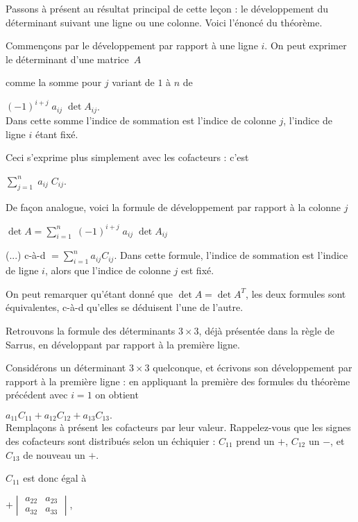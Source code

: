 Passons à présent au résultat principal de cette leçon : le développement du déterminant suivant une ligne ou une colonne. Voici l'énoncé du théorème.

\change
Commençons par le développement par rapport à une ligne $i$. On peut exprimer le déterminant d'une matrice~$A$

\change
comme la somme pour $j$ variant de $1$ à $n$ de

$(-1)^{i+j} \; a_{ij} \; \det A_{ij}$.\\

Dans cette somme l'indice de sommation est l'indice de colonne $j$, l'indice de ligne $i$ étant fixé.

\change
Ceci s'exprime plus simplement avec les cofacteurs : c'est

$\sum_{j=1}^n \; a_{ij} \; C_{ij}$.

\change
De façon analogue, voici la formule de développement par rapport à la colonne $j$

$\det A = \sum_{i=1}^n \; (-1)^{i+j} \; a_{ij} \; \det A_{ij}$

\change
(...)
\newpage	
c-à-d $= \sum_{i=1}^n a_{ij}C_{ij}$.
Dans cette formule, l'indice de sommation est l'indice de ligne $i$, alors que l'indice de colonne $j$ est fixé.

On peut remarquer qu'étant donné que $\det A=\det A^T$, les deux formules sont équivalentes, c-à-d qu'elles se déduisent l'une de l'autre.

\diapo
Retrouvons la formule des déterminants $3\times 3$, déjà présentée 
dans la règle de Sarrus, en développant par rapport à la première ligne.

\change
Considérons un déterminant $3\times 3$ quelconque, et écrivons son développement par rapport à la première ligne : en appliquant la première des formules du théorème précédent avec $i=1$ on obtient

\change
$a_{11}C_{11}+a_{12}C_{12}+a_{13}C_{13}. $\\

Remplaçons à présent les cofacteurs par leur valeur. Rappelez-vous que les signes des cofacteurs sont distribués selon un échiquier : $C_{11}$ prend un $+$, $C_{12}$ un $-$, et $C_{13}$ de nouveau un $+$.

\change
$C_{11}$ est donc égal à 

$+\begin{vmatrix}
a_{22}&a_{23}\\
a_{32}&a_{33}
\end{vmatrix}$,

